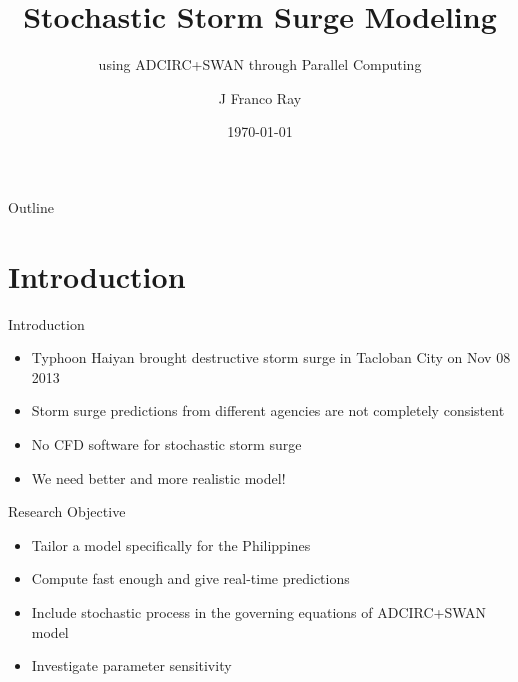 \documentclass[10pt]{beamer}
\title[Stochastic Storm Surge Modeling using ADCIRC+SWAN\ldots]{Stochastic Storm Surge Modeling}
\subtitle{using ADCIRC+SWAN through Parallel Computing}
\author[JF Ray]{J Franco Ray}
\institute{
\sclaffiliation\\
\tref{jbrayo@up.edu.ph}
   }
\date{\today}
\begin{document}
{\SCLtitlepagebg
\begin{frame}
  \maketitle
  \insertSCLDCSUPlogos
\end{frame}}

\begin{frame}[noframenumbering]{Outline}
\tableofcontents
\end{frame}

\section{Introduction}
\begin{frame}{Introduction}
	\begin{itemize}
		\item<1-> Typhoon Haiyan brought destructive storm surge in Tacloban City on Nov 08 2013
		\item<2-> Storm surge predictions from different agencies are not completely consistent
		\item<3-> No CFD software for stochastic storm surge
		\item<4-> We need better and more realistic model!
	\end{itemize}
\end{frame}
\begin{frame}{Research Objective}
	\begin{itemize}
		\item Tailor a model specifically for the Philippines
		\item Compute fast enough and give real-time predictions
		\item Include stochastic process in the governing equations of ADCIRC+SWAN model
		\item Investigate parameter sensitivity
	\end{itemize}
\end{frame}
\end{document}
